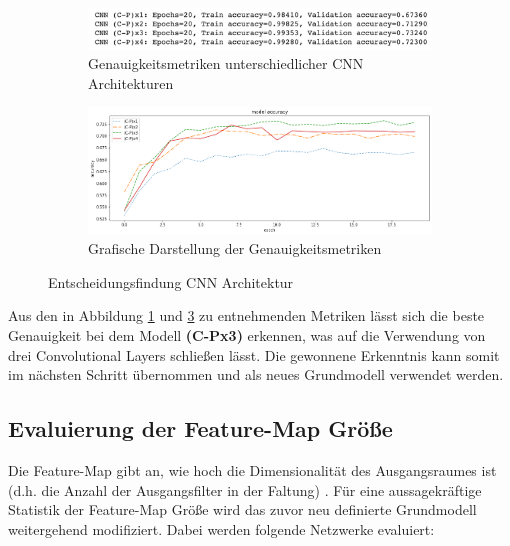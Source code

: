 \begin{figure}[htb]
	\centering
	\begin{subfigure}[ht]{.9\textwidth}
		\includegraphics[width=\textwidth]{images/convlayers_result}
		\caption{Genauigkeitsmetriken unterschiedlicher \ac{CNN} Architekturen}
		\label{fig:convlayer_results}
	\end{subfigure}\hfill%
	\begin{subfigure}[ht]{.9\textwidth}
		\includegraphics[width=\textwidth]{images/convlayers_result_graph}
		\caption{Grafische Darstellung der Genauigkeitsmetriken}
		\label{fig:convlayer_graph_results}
	\end{subfigure}\hfill%
	\caption{Entscheidungsfindung \ac{CNN} Architektur}
\end{figure}

Aus den in Abbildung \ref{fig:convlayer_results} und \ref{fig:convlayer_graph_results} zu entnehmenden Metriken lässt sich die beste Genauigkeit bei dem Modell \textbf{(C-Px3)} erkennen, was auf die Verwendung von drei Convolutional Layers schließen lässt. Die gewonnene Erkenntnis kann somit im nächsten Schritt übernommen und als neues Grundmodell verwendet werden. 

\subsection{Evaluierung der Feature-Map Größe}

Die Feature-Map gibt an, wie hoch die Dimensionalität des Ausgangsraumes ist (d.h. die Anzahl der Ausgangsfilter in der Faltung) \cite{conv2d-2021B}. Für eine aussagekräftige Statistik der Feature-Map Größe wird das zuvor neu definierte Grundmodell weitergehend modifiziert. Dabei werden folgende Netzwerke evaluiert:

